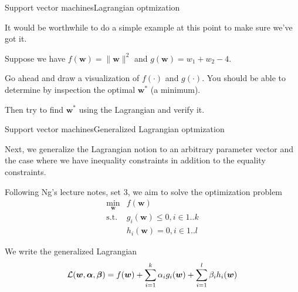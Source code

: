 \documentclass{beamer}
\renewcommand{\vec}[1]{\boldsymbol{#1}}
\begin{document}
\begin{frame}{Support vector machines}{Lagrangian optmization}

  It would be worthwhile to do a simple example at this point to make
  sure we've got it.

  \medskip

  Suppose we have $f(\vec{w}) = \|\vec{w}\|^2$ and $g(\vec{w}) =
  w_1 + w_2 - 4$.

  \medskip

  Go ahead and draw a visualization of $f(\cdot)$ and $g(\cdot)$. You
  should be able to determine by inspection the optimal $\vec{w}^*$
  (a minimum).

  \medskip

  Then try to find $\vec{w}^*$ using the Lagrangian and verify it.
  
\end{frame}


\begin{frame}{Support vector machines}{Generalized Lagrangian optmization}

  Next, we generalize the Lagrangian notion to an arbitrary parameter
  vector and the case where we have \alert{inequality} constraints in
  addition to the equality constraints.

  \medskip

  Following Ng's lecture notes, set 3, we aim to solve the
  optimization problem
  \[ \begin{array}{rl}
    \min_{\vec{w}} & f(\vec{w}) \\
    \text{s.t.}  & g_i(\vec{w}) \le 0, i \in 1..k \\
    & h_i(\vec{w}) = 0, i \in 1..l
    \end{array} \]

  \medskip

  We write the \alert{generalized Lagrangian}
  \[ {\cal L}(\vec{w},\vec{\alpha},\vec{\beta}) =
  f(\vec{w}) + \sum_{i=1}^k \alpha_i g_i(\vec{w}) + \sum_{i=1}^l \beta_i h_i(\vec{w}) \]

\end{frame}
\end{document}

